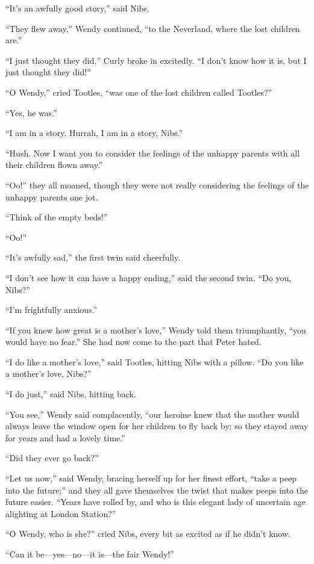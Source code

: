 ``It's an awfully good story,'' said Nibs.

``They flew away,'' Wendy continued, ``to the Neverland, where the lost
children are.''

``I just thought they did,'' Curly broke in excitedly. ``I don't know how
it is, but I just thought they did!''

``O Wendy,'' cried Tootles, ``was one of the lost children called
Tootles?''

``Yes, he was.''

``I am in a story. Hurrah, I am in a story, Nibs.''

``Hush. Now I want you to consider the feelings of the unhappy parents
with all their children flown away.''

``Oo!'' they all moaned, though they were not really considering the
feelings of the unhappy parents one jot.

``Think of the empty beds!''

``Oo!''

``It's awfully sad,'' the first twin said cheerfully.

``I don't see how it can have a happy ending,'' said the second twin. ``Do
you, Nibs?''

``I'm frightfully anxious.''

``If you knew how great is a mother's love,'' Wendy told them
triumphantly, ``you would have no fear.'' She had now come to the part
that Peter hated.

``I do like a mother's love,'' said Tootles, hitting Nibs with a pillow.
``Do you like a mother's love, Nibs?''

``I do just,'' said Nibs, hitting back.

``You see,'' Wendy said complacently, ``our heroine knew that the mother
would always leave the window open for her children to fly back by; so
they stayed away for years and had a lovely time.''

``Did they ever go back?''

``Let us now,'' said Wendy, bracing herself up for her finest effort,
``take a peep into the future;'' and they all gave themselves the twist
that makes peeps into the future easier. ``Years have rolled by, and who
is this elegant lady of uncertain age alighting at London Station?''

``O Wendy, who is she?'' cried Nibs, every bit as excited as if he didn't
know.

``Can it be---yes—no—it is—the fair Wendy!''

